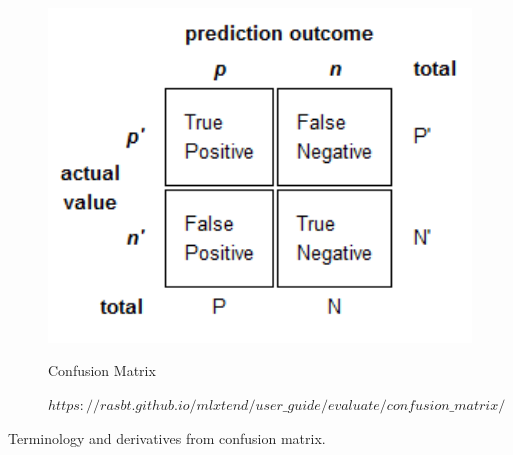 \begin{figure}[tbh] %
\begin{large}
	\includegraphics[width=6in]{images/confusionmatrix.png}
	\caption{Confusion Matrix} %
	
	\caption*{$https://rasbt.github.io/mlxtend/user\_guide/evaluate/confusion\_matrix/$}
	\label{Confusion matrix} %
\end{large}
\end{figure} 
\par
\newpage
Terminology and derivatives from confusion matrix.
